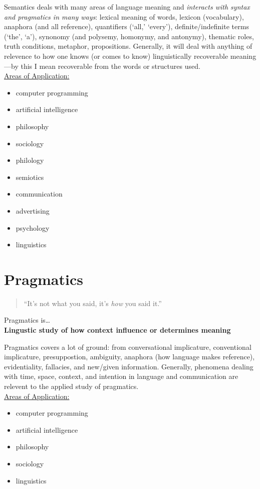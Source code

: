 \documentclass{article}
\begin{document}
Semantics deals with many areas of language meaning and {\sl interacts with syntax and pragmatics in many ways}: lexical meaning of words, lexicon (vocabulary), anaphora (and all reference), quantifiers (`all,' `every'), definite/indefinite terms (`the', `a'), synonomy (and polysemy, homonymy, and antonymy), thematic roles, truth conditions, metaphor, propositions. Generally, it will deal with anything of relevence to how one knows (or comes to know) linguistically recoverable meaning---by this I mean recoverable from the words or structures used.
\\

\underline{Areas of Application:} 
\begin{itemize}
\item computer programming
\item artificial intelligence
\item philosophy
\item sociology
\item philology
\item semiotics
\item communication
\item advertising
\item psychology
\item linguistics
\end{itemize}


\section{Pragmatics}
\begin{quote}
``It's not what you said, it's {\sl how} you said it.''
\end{quote}
\begin{center}
Pragmatics is\ldots \\
{\bf Lingustic study of how context influence or determines meaning}
\end{center}

Pragmatics covers a lot of ground: from conversational implicature, conventional implicature, presuppostion, ambiguity, anaphora (how language makes reference), evidentiality, fallacies, and new/given information. Generally, phenomena dealing with time, space, context, and intention in language and communication are relevent to the applied study of pragmatics.
\\

\underline{Areas of Application:} 
\begin{itemize}
\item computer programming
\item artificial intelligence
\item philosophy
\item sociology
\item linguistics
\end{itemize}
\end{document}
